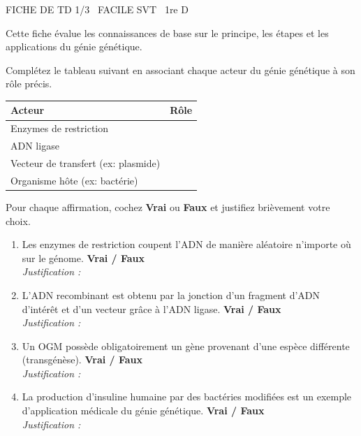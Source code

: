 \documentclass[11pt]{article}
\begin{document}
\begin{tcolorbox}[enhanced,colback=popink,colframe=popink,arc=10pt,boxrule=0pt,left=12pt,right=12pt,top=9pt,bottom=9pt]
{\color{white}\popxbold\small FICHE DE TD 1/3 \textbullet\ FACILE \hfill SVT \textbullet\ 1re D\par}
\end{tcolorbox}
\vspace{4pt}
Cette fiche évalue les connaissances de base sur le principe, les étapes et les applications du génie génétique.

\begin{exercice}
Complétez le tableau suivant en associant chaque acteur du génie génétique à son rôle précis.
\begin{center}
\begin{tabular}{|p{3.5cm}|p{10cm}|}
\hline
\textbf{Acteur} & \textbf{Rôle} \\ \hline
Enzymes de restriction & \\ \hline
ADN ligase & \\ \hline
Vecteur de transfert (ex: plasmide) & \\ \hline
Organisme hôte (ex: bactérie) & \\ \hline
\end{tabular}
\end{center}
\end{exercice}

\begin{exercice}
Pour chaque affirmation, cochez \textbf{Vrai} ou \textbf{Faux} et justifiez brièvement votre choix.
\begin{enumerate}
    \item Les enzymes de restriction coupent l'ADN de manière aléatoire n'importe où sur le génome. \hfill \textbf{Vrai / Faux} \\
    \textit{Justification :}
    \item L'ADN recombinant est obtenu par la jonction d'un fragment d'ADN d'intérêt et d'un vecteur grâce à l'ADN ligase. \hfill \textbf{Vrai / Faux} \\
    \textit{Justification :}
    \item Un OGM possède obligatoirement un gène provenant d'une espèce différente (transgénèse). \hfill \textbf{Vrai / Faux} \\
    \textit{Justification :}
    \item La production d'insuline humaine par des bactéries modifiées est un exemple d'application médicale du génie génétique. \hfill \textbf{Vrai / Faux} \\
    \textit{Justification :}
\end{enumerate}
\end{exercice}
\end{document}
